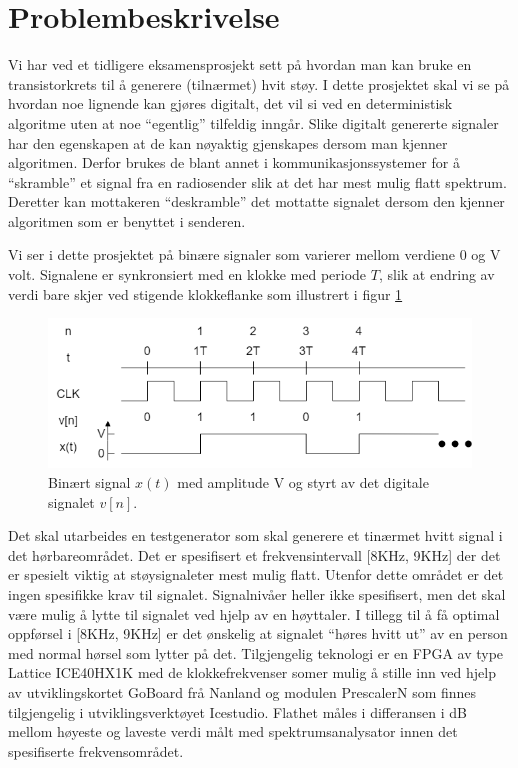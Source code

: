 \section{Problembeskrivelse}
\label{sec:issue}

Vi har ved et tidligere eksamensprosjekt sett på hvordan man kan bruke en transistorkrets til å generere (tilnærmet) hvit støy. I dette prosjektet skal vi se på hvordan noe lignende kan gjøres digitalt, det vil si ved en deterministisk algoritme uten at noe “egentlig” tilfeldig inngår. Slike digitalt genererte signaler har den egenskapen at de kan nøyaktig gjenskapes dersom man kjenner algoritmen. Derfor brukes de blant annet i kommunikasjonssystemer for å “skramble” et signal fra en radiosender slik at det har mest mulig flatt spektrum. Deretter kan mottakeren “deskramble” det mottatte signalet dersom den kjenner algoritmen som er benyttet i senderen.

Vi ser i dette prosjektet på binære signaler som varierer mellom verdiene 0 og V volt. Signalene
er synkronsiert med en klokke med periode $T$, slik at endring av verdi bare skjer ved stigende
klokkeflanke som illustrert i figur \ref{fig:binærtsignal}

\begin{figure}[!hbt]
	\centering
	\includegraphics[scale=0.3]{./Images/01Issue/Binært signal x(t) med amplitude V.drawio.png}
	\caption{ Binært signal $x(t)$ med amplitude V og styrt av det digitale signalet $v[n]$.}
	\label{fig:binærtsignal}
\end{figure}

Det skal utarbeides en testgenerator som skal generere et tinærmet hvitt signal i det hørbareområdet. Det er spesifisert et frekvensintervall [8KHz, 9KHz] der det er spesielt viktig at støysignaleter mest mulig flatt. Utenfor dette området er det ingen spesifikke krav til signalet. Signalnivåer heller ikke spesifisert, men det skal være mulig å lytte til signalet ved hjelp av en høyttaler. I tillegg til å få optimal oppførsel i [8KHz, 9KHz] er det ønskelig at signalet “høres hvitt ut” av en person med normal hørsel som lytter på det. Tilgjengelig teknologi er en FPGA av type Lattice ICE40HX1K med de klokkefrekvenser somer mulig å stille inn ved hjelp av utviklingskortet GoBoard frå Nanland og modulen PrescalerN som finnes tilgjengelig i utviklingsverktøyet Icestudio.  Flathet måles i differansen i dB mellom høyeste og laveste verdi målt med spektrumsanalysator innen det spesifiserte frekvensområdet.
